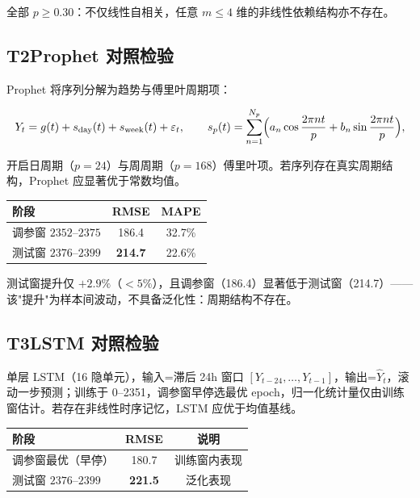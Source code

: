 \documentclass{internal-report}
\begin{document}
全部 $p \ge 0.30$：不仅线性自相关，任意 $m\le 4$ 维的非线性依赖结构亦不存在。

\subsection{T2\quad Prophet 对照检验}

Prophet 将序列分解为趋势与傅里叶周期项：

\begin{equation}
  Y_t = g(t) + s_{\text{day}}(t) + s_{\text{week}}(t) + \varepsilon_t,
  \qquad s_p(t) = \sum_{n=1}^{N_p}\Bigl(a_n\cos\frac{2\pi n t}{p} + b_n\sin\frac{2\pi n t}{p}\Bigr),
  \label{eq:prophet}
\end{equation}

开启日周期（$p=24$）与周周期（$p=168$）傅里叶项。若序列存在真实周期结构，Prophet 应显著优于常数均值。

\begin{center}
\begin{tabular}{lcc}
\toprule
阶段 & RMSE & MAPE \\
\midrule
调参窗 $2352$--$2375$ & 186.4 & 32.7\% \\
测试窗 $2376$--$2399$ & \textbf{214.7} & 22.6\% \\
\bottomrule
\end{tabular}
\end{center}

测试窗提升仅 $+2.9\%$（$<5\%$），且调参窗（186.4）显著低于测试窗（214.7）——该"提升"为样本间波动，不具备泛化性：周期结构不存在。

\subsection{T3\quad LSTM 对照检验}

单层 LSTM（16 隐单元），输入=滞后 24h 窗口 $[Y_{t-24},\ldots,Y_{t-1}]$，输出=$\hat{Y}_t$，滚动一步预测；训练于 0--2351，调参窗早停选最优 epoch，归一化统计量仅由训练窗估计。若存在非线性时序记忆，LSTM 应优于均值基线。

\begin{center}
\begin{tabular}{lcc}
\toprule
阶段 & RMSE & 说明 \\
\midrule
调参窗最优（早停） & 180.7 & 训练窗内表现 \\
测试窗 $2376$--$2399$ & \textbf{221.5} & 泛化表现 \\
\bottomrule
\end{tabular}
\end{center}
\end{document}
